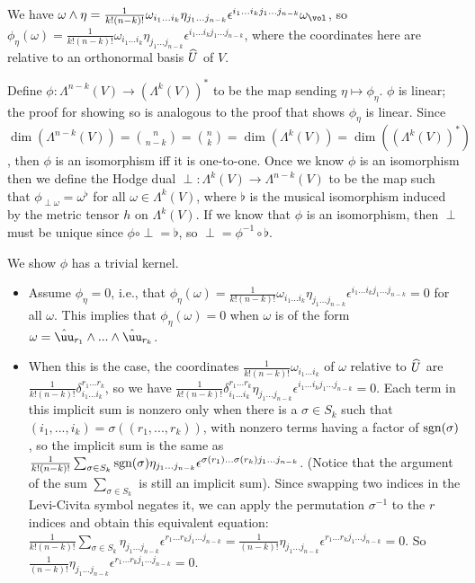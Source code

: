 \documentclass{article}
\begin{document}
\begin{itemize}
\begin{itemize}
        We have $\omega \wedge \eta = \frac{1}{k!(n - k)!} \omega_{i_1 ... i_k} \eta_{j_1 ... j_{n - k}} \epsilon^{i_1 ... i_k j_1 ... j_{n - k}} \omega_\vol$, so $\phi_\eta(\omega) = \frac{1}{k!(n - k)!} \omega_{i_1 ... i_k} \eta_{j_1 ... j_{n - k}} \epsilon^{i_1 ... i_k j_1 ... j_{n - k}}$, where the coordinates here are relative to an orthonormal basis $\widehat{U}$ of $V$.
        
        Define $\phi:\Lambda^{n - k}(V) \rightarrow (\Lambda^k(V))^*$ to be the map sending $\eta \mapsto \phi_\eta$. $\phi$ is linear; the proof for showing so is analogous to the proof that shows $\phi_\eta$ is linear. Since $\dim(\Lambda^{n - k}(V)) = \binom{n}{n - k} = \binom{n}{k} = \dim(\Lambda^k(V)) = \dim((\Lambda^k(V))^*)$, then $\phi$ is an isomorphism iff it is one-to-one. Once we know $\phi$ is an isomorphism then we define the Hodge dual $\perp:\Lambda^k(V) \rightarrow \Lambda^{n - k}(V)$ to be the map such that $\phi_{\perp \omega} = \omega^\flat$ for all $\omega \in \Lambda^k(V)$, where $\flat$ is the musical isomorphism induced by the metric tensor $h$ on $\Lambda^k(V)$. If we know that $\phi$ is an isomorphism, then $\perp$ must be unique since $\phi \circ \perp = \flat$, so $\perp = \phi^{-1} \circ \flat$.
        
        We show $\phi$ has a trivial kernel.
        \begin{itemize}
            \item Assume $\phi_\eta = 0$, i.e., that $\phi_\eta(\omega) = \frac{1}{k!(n - k)!} \omega_{i_1 ... i_k} \eta_{j_1 ... j_{n - k}} \epsilon^{i_1 ... i_k j_1 ... j_{n - k}} = 0$ for all $\omega$. This implies that $\phi_\eta(\omega) = 0$ when $\omega$ is of the form $\omega = \huu_{r_1} \wedge ... \wedge \huu_{r_k}$.
            
            \item When this is the case, the coordinates $\frac{1}{k!(n - k)!} \omega_{{i_1}...{i_k}}$ of $\omega$ relative to $\widehat{U}$ are $\frac{1}{k!(n - k)!} \delta^{r_1 ... r_k}_{i_1 ... i_k}$, so we have $\frac{1}{k!(n - k)!} \delta^{r_1 ... r_k}_{i_1 ... i_k} \eta_{j_1 ... j_{n - k}} \epsilon^{i_1 ... i_k j_1 ... j_{n - k}} = 0$. Each term in this implicit sum is nonzero only when there is a $\sigma \in S_k$ such that $(i_1, ..., i_k) = \sigma((r_1, ..., r_k))$, with nonzero terms having a factor of $\text{sgn}(\sigma)$, so the implicit sum is the same as $\frac{1}{k!(n - k)!} \sum_{\sigma \in S_k} \text{sgn}(\sigma) \eta_{j_1 ... j_{n - k}} \epsilon^{\sigma(r_1) ... \sigma(r_k) j_1 ... j_{n - k}}$. (Notice that the argument of the sum $\sum_{\sigma \in S_k}$ is still an implicit sum). Since swapping two indices in the Levi-Civita symbol negates it, we can apply the permutation $\sigma^{-1}$ to the $r$ indices and obtain this equivalent equation: $\frac{1}{k!(n - k)!} \sum_{\sigma \in S_k} \eta_{j_1 ... j_{n - k}} \epsilon^{r_1 ... r_k j_1 ... j_{n - k}} = \frac{1}{(n - k)!} \eta_{j_1 ... j_{n - k}} \epsilon^{r_1 ... r_k j_1 ... j_{n - k}} = 0$. So $\frac{1}{(n - k)!} \eta_{j_1 ... j_{n - k}} \epsilon^{r_1 ... r_k j_1 ... j_{n - k}} = 0$.
        

\end{itemize}
\end{itemize}
\end{itemize}
\end{document}
